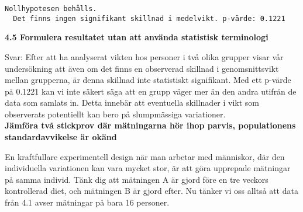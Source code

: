 \documentclass[
  letterpaper,
  DIV=11,
  numbers=noendperiod]{scrartcl}
\newenvironment{Shaded}{\begin{snugshade}}{\end{snugshade}}
\newcommand{\AttributeTok}[1]{\textcolor[rgb]{0.40,0.45,0.13}{#1}}
\newcommand{\ConstantTok}[1]{\textcolor[rgb]{0.56,0.35,0.01}{#1}}
\newcommand{\ControlFlowTok}[1]{\textcolor[rgb]{0.00,0.23,0.31}{#1}}
\newcommand{\DecValTok}[1]{\textcolor[rgb]{0.68,0.00,0.00}{#1}}
\newcommand{\FloatTok}[1]{\textcolor[rgb]{0.68,0.00,0.00}{#1}}
\newcommand{\FunctionTok}[1]{\textcolor[rgb]{0.28,0.35,0.67}{#1}}
\newcommand{\NormalTok}[1]{\textcolor[rgb]{0.00,0.23,0.31}{#1}}
\newcommand{\OtherTok}[1]{\textcolor[rgb]{0.00,0.23,0.31}{#1}}
\newcommand{\SpecialCharTok}[1]{\textcolor[rgb]{0.37,0.37,0.37}{#1}}
\newcommand{\StringTok}[1]{\textcolor[rgb]{0.13,0.47,0.30}{#1}}
\begin{document}
\begin{Shaded}
\end{Shaded}

\begin{verbatim}
Nollhypotesen behålls.
  Det finns ingen signifikant skillnad i medelvikt. p-värde: 0.1221
\end{verbatim}

\textbf{4.5 Formulera resultatet utan att använda statistisk
terminologi}

\hfill\break
Svar: Efter att ha analyserat vikten hos personer i två olika grupper
visar vår undersökning att även om det finns en observerad skillnad i
genomsnittsvikt mellan grupperna, är denna skillnad inte statistiskt
signifikant. Med ett p-värde på 0.1221 kan vi inte säkert säga att en
grupp väger mer än den andra utifrån de data som samlats in. Detta
innebär att eventuella skillnader i vikt som observerats potentiellt kan
bero på slumpmässiga variationer.\\

\textbf{Jämföra två stickprov där mätningarna hör ihop parvis,
populationens standardavvikelse är okänd}

En kraftfullare experimentell design när man arbetar med människor, där
den individuella variationen kan vara mycket stor, är att göra upprepade
mätningar på samma individ. Tänk dig att mätningen A är gjord före en
tre veckors kontrollerad diet, och mätningen B är gjord efter. Nu tänker
vi oss alltså att data från 4.1 avser mätningar på bara 16 personer.
\end{document}
